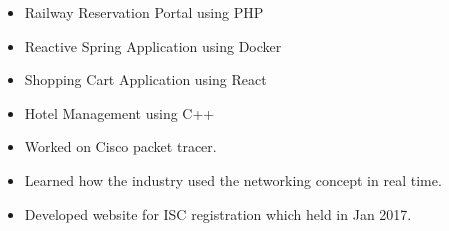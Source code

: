 







\medskip



\begin{itemize}
\item Railway Reservation Portal using PHP
\item Reactive Spring Application using Docker
\item Shopping Cart Application using React
\item Hotel Management using C++
\end{itemize}




\begin{itemize}
\item Worked on Cisco packet tracer. 
\end{itemize}

\begin{itemize}
\item Learned how the industry used the networking concept in real time.
\end{itemize}

\begin{itemize}
\item Developed website for ISC registration which held in Jan 2017.
\end{itemize}



